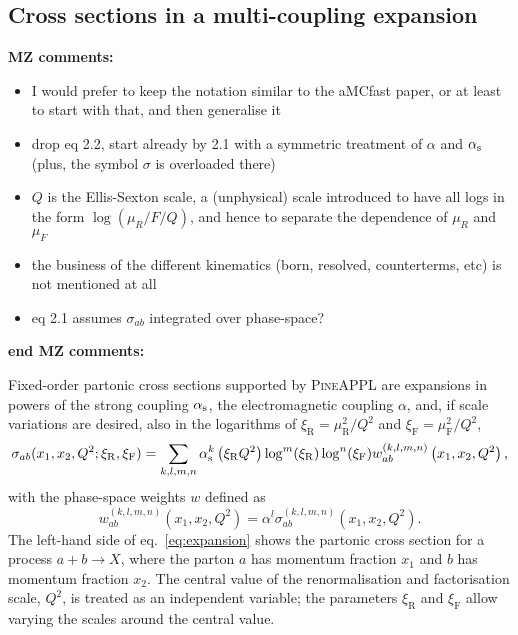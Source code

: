 \subsection{Cross sections in a multi-coupling expansion}
\label{sec:multi-coupling-expansion}
{\bf MZ comments:}
\begin{itemize}
    \item I would prefer to keep the notation similar to the aMCfast paper, or at least to start with that, and then generalise it
    \item drop eq 2.2, start already by 2.1 with a symmetric treatment of $\alpha$ and $\alpha_\mathrm{s}$ (plus, the symbol $\sigma$ is overloaded there)
    \item $Q$ is the Ellis-Sexton scale, a (unphysical) scale introduced to have all logs in the form $\log(\mu_R/F / Q)$, and hence to separate
        the dependence of $\mu_R$ and $\mu_F$
    \item the business of the different kinematics (born, resolved, counterterms, etc) is not mentioned at all
    \item eq 2.1 assumes $\sigma_{ab}$ integrated over phase-space?
\end{itemize}
{\bf end MZ comments:}

Fixed-order partonic cross sections supported by \textsc{PineAPPL} are expansions in powers of the strong coupling $\alpha_\mathrm{s}$, the electromagnetic coupling $\alpha$, and, if scale variations are desired, also in the logarithms of $\xi_\mathrm{R} = \mu_\mathrm{R}^2 / Q^2$ and $\xi_\mathrm{F} = \mu_\mathrm{F}^2 / Q^2$,
\begin{equation}
\sigma_{ab} (x_1, x_2, Q^2; \xi_\mathrm{R}, \xi_\mathrm{F}) = \sum_{k,l,m,n} \alpha_\mathrm{s}^k \left( \xi_\mathrm{R} Q^2 \right) \log^m ( \xi_\mathrm{R} ) \log^n ( \xi_\mathrm{F} ) w_{ab}^{(k,l,m,n)} \left( x_1, x_2, Q^2 \right) \text{,}
\label{eq:expansion}
\end{equation}
with the phase-space weights $w$ defined as
\begin{equation}
w_{ab}^{(k,l,m,n)} \left( x_1, x_2, Q^2 \right) = \alpha^l \sigma_{ab}^{(k,l,m,n)} \left( x_1, x_2, Q^2 \right) \text{.}
\label{eq:phase-space-weight}
\end{equation}
The left-hand side of eq.~\eqref{eq:expansion} shows the partonic cross section for a process $a + b \to X$, where the parton $a$ has momentum fraction $x_1$ and $b$ has momentum fraction $x_2$.
The central value of the renormalisation and factorisation scale, $Q^2$, is treated as an independent variable; the parameters $\xi_\mathrm{R}$ and $\xi_\mathrm{F}$ allow varying the scales around the central value.

